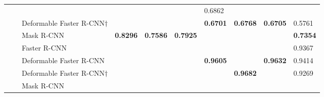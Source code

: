 \documentclass{ieeeaccess}
\begin{document}
\begin{table*}
\begin{tabularx}{\linewidth}{|u|u|t|v|v|k|v|v|k|k|}
        \footnotesize {}&
        \footnotesize {}&
        \footnotesize {}&
        \footnotesize {}&
        \footnotesize {}&
        \footnotesize {}&
        \footnotesize {0.6862} \\
         & &\footnotesize  Deformable Faster R-CNN$\dagger$&
        \footnotesize {}&
        \footnotesize {}&
        \footnotesize {}&
        \footnotesize \centering \textbf{0.6701}&
        \footnotesize \centering \textbf{0.6768}&
        \footnotesize \centering \textbf{0.6705}&
        \footnotesize {0.5761} \\
        & &\footnotesize  Mask R-CNN&
        \footnotesize \centering \textbf{0.8296}&
        \footnotesize \centering \textbf{0.7586}&
        \footnotesize \centering \textbf{0.7925}&
        \footnotesize {}&
        \footnotesize {}&
        \footnotesize {}&
        \footnotesize 
        \textbf{0.7354} \\
        
        & \footnotesize {}&
        \footnotesize  Faster R-CNN&
        \footnotesize {}&
        \footnotesize {}&
        \footnotesize {}&
        \footnotesize {}&
        \footnotesize {}&
        \footnotesize {}&
        \footnotesize 
        {0.9367} \\
        & &\footnotesize  Deformable Faster R-CNN &
        
        \footnotesize {}&
        \footnotesize {}&
        \footnotesize {}&
        \footnotesize \centering \textbf{0.9605}&
        \footnotesize {}&
        \footnotesize \centering \textbf{0.9632}&
        \footnotesize {0.9414} \\
         & &\footnotesize  Deformable Faster R-CNN$\dagger$&
        \footnotesize {}&
        \footnotesize {}&
        \footnotesize {}&
        \footnotesize {}&
        \footnotesize \centering \textbf{0.9682}&
        \footnotesize {}&
        \footnotesize {0.9269} \\
        & &\footnotesize  Mask R-CNN&
        

\end{tabularx}
\end{table*}
\end{document}
